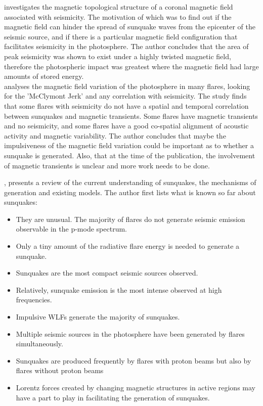\cite{2008MNRAS.389.1905M} investigates the magnetic topological structure of a coronal magnetic field associated with seismicity. The motivation of which was to find out if the magnetic field can hinder the spread of sunquake waves from the epicenter of the seismic source, and if there is a particular magnetic field configuration that facilitates seismicity in the photosphere. The author concludes that the area of peak seismicity was shown to exist under a highly twisted magnetic field, therefore the photospheric impact was greatest where the magnetic field had large amounts of stored energy.\\   

\cite{2009MNRAS.395L..39M} analyses the magnetic field variation of the photosphere in many flares, looking for the 'McClymont Jerk' and any correlation with seismicity. The study finds that some flares with seismicity do not have a spatial and temporal correlation between sunquakes and magnetic transients. Some flares have magnetic transients and no seismicity, and some flares have a good co-spatial alignment of acoustic activity and magnetic variability. The author concludes that maybe the impulsiveness of the magnetic field variation could be important as to whether a sunquake is generated. Also, that at the time of the publication, the involvement of magnetic transients is unclear and more work needs to be done.

\cite{2011SSRv..158..451D}, presents a review of the current understanding of sunquakes, the mechanisms of generation and existing models. The author first lists what is known so far about sunquakes:

\begin{itemize}
\item They are unusual. The majority of flares do not generate seismic emission observable in the p-mode spectrum.
\item Only a tiny amount of the radiative flare energy is needed to generate a sunquake.
\item Sunquakes are the most compact seismic sources observed.
\item Relatively, sunquake emission is the most intense observed at high frequencies.
\item Impulsive WLFs generate the majority of sunquakes. 
\item Multiple seismic sources in the photosphere have been generated by flares simultaneously.
\item Sunquakes are produced frequently by flares with proton beams but also by flares without proton beams
\item Lorentz forces created by changing magnetic structures in active regions may have a part to play in facilitating the generation of sunquakes.
\end{itemize}

